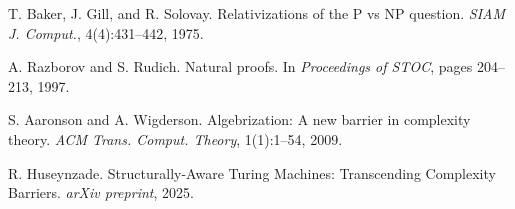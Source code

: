 \documentclass[11pt]{article}
\begin{document}
\begin{thebibliography}{9}
 T. Baker, J. Gill, and R. Solovay. Relativizations of the P vs NP question. \emph{SIAM J. Comput.}, 4(4):431--442, 1975.

 A. Razborov and S. Rudich. Natural proofs. In \emph{Proceedings of STOC}, pages 204--213, 1997.

 S. Aaronson and A. Wigderson. Algebrization: A new barrier in complexity theory. \emph{ACM Trans. Comput. Theory}, 1(1):1--54, 2009.

 R. Huseynzade. Structurally-Aware Turing Machines: Transcending Complexity Barriers. \emph{arXiv preprint}, 2025.
\end{thebibliography}
\end{document}
